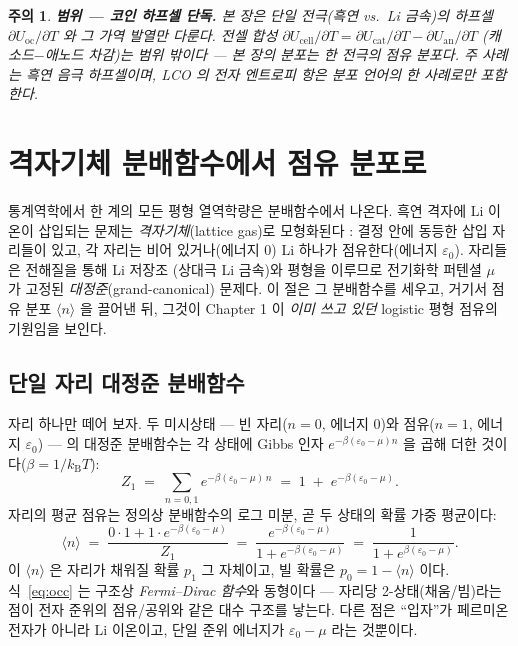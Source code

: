 \documentclass[11pt,a4paper]{article}
\newtheorem*{warnbox}{주의}
\newcommand{\oc}{\mathrm{oc}}
\newcommand{\kB}{k_{\mathrm B}}
\newcommand{\avg}[1]{\langle #1\rangle}
\begin{document}
\begin{warnbox}
\textbf{범위 — 코인 하프셀 단독.} 본 장은 단일 전극(흑연 vs.\ Li 금속)의 하프셀 $\partial U_\oc/\partial T$ 와
그 가역 발열만 다룬다. 전셀 합성 $\partial U_\mathrm{cell}/\partial T=\partial U_\mathrm{cat}/\partial T-\partial
U_\mathrm{an}/\partial T$ (캐소드$-$애노드 차감)는 \emph{범위 밖}이다 — 본 장의 분포는 한 전극의 점유 분포다.
주 사례는 흑연 음극 하프셀이며, LCO 의 전자 엔트로피 항은 분포 언어의 한 사례로만 포함한다.
\end{warnbox}

\section{격자기체 분배함수에서 점유 분포로}\label{sec:partition}
통계역학에서 한 계의 모든 평형 열역학량은 분배함수에서 나온다. 흑연 격자에 Li 이온이 삽입되는 문제는
\emph{격자기체}(lattice gas)로 모형화된다 \cite{newman,huggins2009}: 결정 안에 동등한 삽입 자리들이 있고,
각 자리는 비어 있거나(에너지 0) Li 하나가 점유한다(에너지 $\varepsilon_0$). 자리들은 전해질을 통해 Li 저장조
(상대극 Li 금속)와 평형을 이루므로 전기화학 퍼텐셜 $\mu$ 가 고정된 \emph{대정준}(grand-canonical) 문제다.
이 절은 그 분배함수를 세우고, 거기서 점유 분포 $\avg{n}$ 을 끌어낸 뒤, 그것이 Chapter 1 이 \emph{이미 쓰고
있던} logistic 평형 점유의 기원임을 보인다.

\subsection{단일 자리 대정준 분배함수}
자리 하나만 떼어 보자. 두 미시상태 — 빈 자리($n=0$, 에너지 0)와 점유($n=1$, 에너지 $\varepsilon_0$) — 의
대정준 분배함수는 각 상태에 Gibbs 인자 $e^{-\beta(\varepsilon_0-\mu)n}$ 을 곱해 더한 것이다($\beta=1/\kB T$):
\begin{equation}
Z_1 \;=\; \sum_{n=0,1} e^{-\beta(\varepsilon_0-\mu)\,n}
\;=\; 1 \;+\; e^{-\beta(\varepsilon_0-\mu)}.
\label{eq:Z1}
\end{equation}
자리의 평균 점유는 정의상 분배함수의 로그 미분, 곧 두 상태의 확률 가중 평균이다:
\begin{equation}
\avg{n} \;=\; \frac{0\cdot 1 + 1\cdot e^{-\beta(\varepsilon_0-\mu)}}{Z_1}
\;=\; \frac{e^{-\beta(\varepsilon_0-\mu)}}{1+e^{-\beta(\varepsilon_0-\mu)}}
\;=\; \frac{1}{1+e^{\beta(\varepsilon_0-\mu)}}.
\label{eq:occ}
\end{equation}
이 $\avg{n}$ 은 자리가 채워질 확률 $p_1$ 그 자체이고, 빌 확률은 $p_0=1-\avg{n}$ 이다. 식~\eqref{eq:occ} 는
구조상 \emph{Fermi--Dirac 함수}와 동형이다 — 자리당 2-상태(채움/빔)라는 점이 전자 준위의 점유/공위와 같은
대수 구조를 낳는다. 다른 점은 ``입자''가 페르미온 전자가 아니라 Li 이온이고, 단일 준위 에너지가
$\varepsilon_0-\mu$ 라는 것뿐이다.
\end{document}
